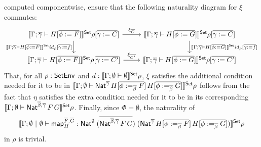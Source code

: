 \documentclass{lmcs}
\theoremstyle{plain}\newtheorem{satz}[thm]{Satz}
\renewcommand{\id}{\mathit{id}}
\newcommand{\map}{\mathsf{map}}
\begin{document}
{\begin{itemize}
computed componentwise, ensure that the following naturality diagram
for $\xi$ commutes:
{\footnotesize
\[\begin{tikzcd}
\setsem{\Gamma ;\ol{\gamma} \vdash H[\ol{\phi := F}]}\rho[\ol{\gamma
      := C}] \ar[r, "{\xi_{\ol{C}}}"]
\ar[d, "{\setsem{\Gamma ;\ol{\gamma} \vdash H[\ol{\phi :=
          F}]}\id_{\rho}[\ol{\gamma := f}]}"']
& \setsem{\Gamma ; \ol{\gamma} \vdash H[\ol{\phi := G}]}\rho[\ol{\gamma
      := C}]
\ar[d, "{\setsem{\Gamma ; \ol{\gamma} \vdash H[\ol{\phi :=
          G}]}\id_{\rho}[\ol{\gamma := f}]}"]\\
\setsem{\Gamma ;\ol{\gamma} \vdash H[\ol{\phi := F}]}\rho[\ol{\gamma
      := C'}] \ar[r, "{\xi_{\ol{C'}}}"]
& \setsem{\Gamma ; \ol{\gamma} \vdash H[\ol{\phi := G}]}\rho[\ol{\gamma
      := C'}] 
\end{tikzcd}\]}
That, for all $\rho : \mathsf{SetEnv}$ and $d : \llbracket{\Gamma; \emptyset \vdash
  \emptyset}\rrbracket^{\mathsf{Set}}\rho$, $\xi$ satisfies the additional condition needed for
it to be in $\llbracket{\Gamma; \emptyset \vdash
  \mathsf{Nat}^{\overline{\gamma}}\,H[\overline{\phi :=_{\overline{\beta}} F}]\,H[\overline{\phi
      :=_{\overline{\beta}} G}]}\rrbracket^{\mathsf{Set}}\rho$ follows from the fact
that $\eta$ satisfies the extra
condition needed for it to be in its corresponding
$\llbracket{\Gamma; \emptyset \vdash \mathsf{Nat}^{\overline{\beta},\overline{\gamma}}\,F\,G}\rrbracket^{\mathsf{Set}} \rho$.
Finally, since $\Phi = \emptyset$, the naturality of
\[
\setsem{\Gamma; \emptyset~|~\emptyset \vdash \map^{\ol{F},\ol{G}}_H
    : \Nat^\emptyset\;(\ol{\Nat^{\ol{\beta},\ol{\gamma}}\,F\,G})\;
    (\Nat^{\ol{\gamma}}\,H[\ol{\phi :=_{\ol{\beta}} F}]\,H[\ol{\phi
        :=_{\ol{\beta}} G}])}\rho
\]
in $\rho$ is trivial.



\end{itemize}}
\end{document}
